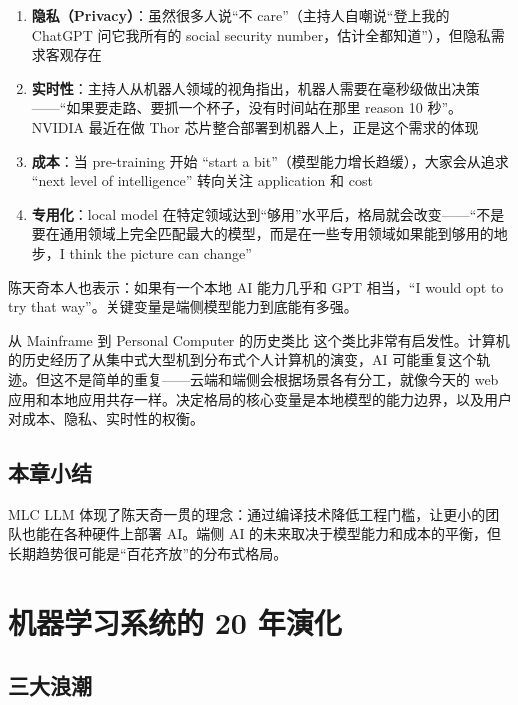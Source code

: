 \documentclass[a4paper]{article}
\begin{document}
\begin{enumerate}
    \item \textbf{隐私（Privacy）}：虽然很多人说``不 care''（主持人自嘲说``登上我的 ChatGPT 问它我所有的 social security number，估计全都知道''），但隐私需求客观存在
    \item \textbf{实时性}：主持人从机器人领域的视角指出，机器人需要在毫秒级做出决策------``如果要走路、要抓一个杯子，没有时间站在那里 reason 10 秒''。NVIDIA 最近在做 Thor 芯片整合部署到机器人上，正是这个需求的体现
    \item \textbf{成本}：当 pre-training 开始 ``start a bit''（模型能力增长趋缓），大家会从追求 ``next level of intelligence'' 转向关注 application 和 cost
    \item \textbf{专用化}：local model 在特定领域达到``够用''水平后，格局就会改变------``不是要在通用领域上完全匹配最大的模型，而是在一些专用领域如果能到够用的地步，I think the picture can change''
\end{enumerate}

陈天奇本人也表示：如果有一个本地 AI 能力几乎和 GPT 相当，``I would opt to try that way''。关键变量是端侧模型能力到底能有多强。

\begin{knowledgebox}{从 Mainframe 到 Personal Computer 的历史类比}
这个类比非常有启发性。计算机的历史经历了从集中式大型机到分布式个人计算机的演变，AI 可能重复这个轨迹。但这不是简单的重复------云端和端侧会根据场景各有分工，就像今天的 web 应用和本地应用共存一样。决定格局的核心变量是本地模型的能力边界，以及用户对成本、隐私、实时性的权衡。
\end{knowledgebox}

\subsection{本章小结}

MLC LLM 体现了陈天奇一贯的理念：通过编译技术降低工程门槛，让更小的团队也能在各种硬件上部署 AI。端侧 AI 的未来取决于模型能力和成本的平衡，但长期趋势很可能是``百花齐放''的分布式格局。

\section{机器学习系统的 20 年演化}

\subsection{三大浪潮}
\end{document}
